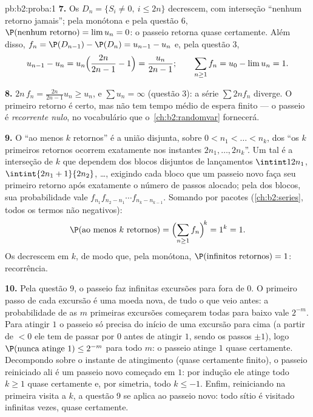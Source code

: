 \begin{solution}{pb:b2:proba:1}
\textbf{7.} Os  $D_n = \{S_i \neq 0,\ i \leq 2n\}$
decrescem, com interseção ``nenhum retorno jamais''; pela
 monótona e pela questão 6, $\P(\text{nenhum retorno}) = \lim u_n =
0$: o passeio retorna quase certamente. Além disso, $f_n = \P(D_{n-1})
- \P(D_n) = u_{n-1} - u_n$ e, pela questão 3,
\[
u_{n-1} - u_n = u_n\Bigl(\frac{2n}{2n-1} - 1\Bigr) =
\frac{u_n}{2n-1};
\qquad
\sum_{n\geq1}f_n = u_0 - \lim u_n = 1 .
\]

\textbf{8.} $2n\,f_n = \frac{2n}{2n-1}u_n \geq u_n$, e
$\sum u_n = \infty$ (questão 3): a série $\sum 2nf_n$
diverge. O primeiro retorno é certo, mas não tem tempo médio
de espera finito --- o passeio é \emph{recorrente nulo}, no
vocabulário que o~\cref{ch:b2:randomvar} fornecerá.

\textbf{9.} O  ``ao menos $k$ retornos'' é a
união  disjunta, sobre $0 < n_1 < \dots < n_k$, dos
 ``os $k$ primeiros retornos ocorrem exatamente nos instantes
$2n_1, \dots, 2n_k$''. Um tal  é a interseção de
$k$  que dependem dos blocos disjuntos de lançamentos
$\intint1{2n_1}$, $\intint{2n_1+1}{2n_2}$, \dots, exigindo cada bloco
que um passeio novo faça seu primeiro retorno após
exatamente o número de passos alocado; pela  dos
blocos, sua probabilidade vale $f_{n_1}f_{n_2-n_1}\cdots
f_{n_k-n_{k-1}}$. Somando por pacotes (\cref{ch:b2:series},
todos os termos não negativos):
\[
\P(\text{ao menos }k\text{ retornos})
= \Bigl(\sum_{n\geq1}f_n\Bigr)^{\!k} = 1^k = 1 .
\]
Os  decrescem em $k$, de modo que, pela  monótona,
$\P(\text{infinitos retornos}) = 1$: recorrência.

\textbf{10.} Pela questão 9, o passeio faz infinitas
excursões para fora de $0$. O primeiro passo de cada excursão é
uma moeda nova,  de tudo o que veio antes: a
probabilidade de as $m$ primeiras excursões começarem todas para baixo
vale $2^{-m}$. Para atingir $1$ o passeio só precisa do início de uma
excursão para cima (a partir de $<0$ ele tem de passar por $0$ antes
de atingir $1$, sendo os passos $\pm1$), logo $\P(\text{nunca atinge }1)
\leq 2^{-m}$ para todo $m$: o passeio atinge $1$ quase certamente.
Decompondo sobre o instante de atingimento (quase certamente finito), o
passeio reiniciado ali é um passeio novo começado em $1$: por
indução ele atinge todo $k \geq 1$ quase certamente e, por
simetria, todo $k \leq -1$. Enfim, reiniciando na primeira
visita a $k$, a questão 9 se aplica ao passeio novo: todo
sítio é visitado infinitas vezes, quase certamente.


\end{solution}
